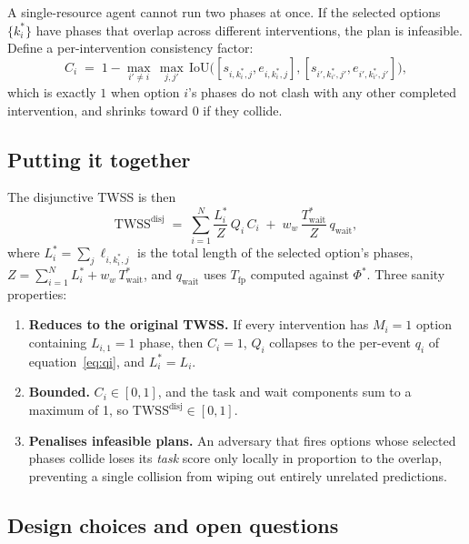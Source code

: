 \documentclass[11pt]{article}
\newcommand{\TWSS}{\mathrm{TWSS}}
\newcommand{\Twait}{T_{\text{wait}}}
\newcommand{\Tfp}{T_{\text{fp}}}
\newcommand{\qi}{q_i}
\newcommand{\qwait}{q_{\text{wait}}}
\begin{document}
A single-resource agent cannot run two phases at once. If the
selected options $\{k^*_i\}$ have phases that overlap across
different interventions, the plan is infeasible. Define a
per-intervention consistency factor:
\begin{equation}
  C_i \;=\; 1 - \max_{i' \neq i}\,
            \max_{j, j'}\,
            \mathrm{IoU}\!\bigl([s_{i,k^*_i,j}, e_{i,k^*_i,j}],
                                [s_{i',k^*_{i'},j'}, e_{i',k^*_{i'},j'}]\bigr),
\end{equation}
which is exactly $1$ when option $i$'s phases do not clash with any other 
completed intervention, and shrinks toward $0$ if they collide.

\subsection{Putting it together}
\label{sec:disj-twss}

The disjunctive TWSS is then
\begin{equation}
  \boxed{\;
    \TWSS^{\text{disj}}
    \;=\; \sum_{i=1}^N \frac{L_i^*}{Z}\,Q_i\,C_i
      \;+\; w_w\,\frac{\Twait^*}{Z}\,\qwait,
  \;}
  \label{eq:twss-disj}
\end{equation}
where $L_i^* = \sum_j \ell_{i,k^*_i,j}$ is the total length of the
selected option's phases, $Z = \sum_{i=1}^N L_i^* + w_w\,\Twait^*$,
and $\qwait$ uses $\Tfp$ computed against $\Phi^*$. Three sanity properties:
\begin{enumerate}
  \item \textbf{Reduces to the original TWSS.} If every intervention
    has $M_i = 1$ option containing $L_{i,1} = 1$ phase, then $C_i =
    1$, $Q_i$ collapses to the per-event $\qi$ of
    equation~\eqref{eq:qi}, and $L_i^* = L_i$.
  \item \textbf{Bounded.} $C_i \in [0, 1]$, and the task and wait components 
    sum to a maximum of 1, so $\TWSS^{\text{disj}} \in [0, 1]$.
  \item \textbf{Penalises infeasible plans.} An adversary that fires
    options whose selected phases collide loses its \textit{task} score only locally 
    in proportion to the overlap, preventing a single collision from wiping out entirely 
    unrelated predictions. 
\end{enumerate}

\subsection{Design choices and open questions}
\end{document}
